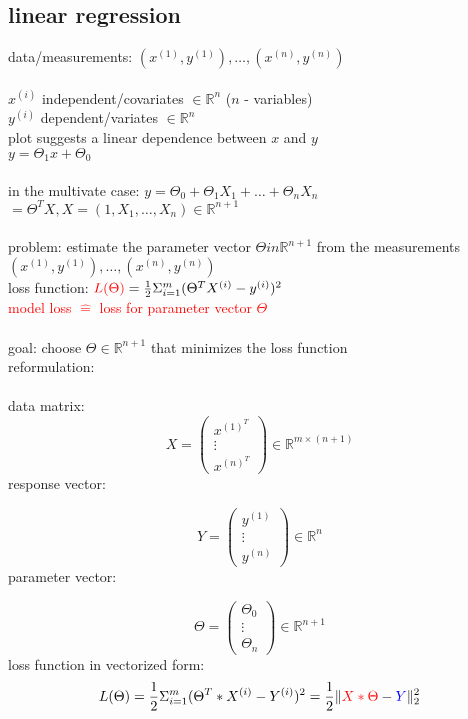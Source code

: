 \subsection*{linear regression}
data/measurements: $(x^{(1)}, y^{(1)}), \dots , (x^{(n)}, y^{(n)})$ \\\\
$x^{(i)}$ independent/covariates $\in \mathbb{R}^n$ ($n$ - variables)\\
$y^{(i)}$ dependent/variates $\in \mathbb{R}^n$\\
plot suggests a linear dependence between $x$ and $y$ \\
$y = \Theta_1 x + \Theta_0$\\\\
in the multivate case: $y = \Theta_0 + \Theta_1 X_1 + \dots + \Theta_n X_n$\\
$= \Theta^T X, X = (1, X_1, \dots ,X_n ) \in \mathbb{R}^{n+1}$\\\\

problem: estimate the parameter vector $\Theta in \mathbb{R}^{n+1}$ from the measurements $(x^{(1)}, y^{(1)}), \dots , (x^{(n)}, y^{(n)})$\\
loss function: $\textcolor{red}{L(\Theta)} = \frac{1}{2} \Sigma^m_{i=1} (\Theta^T X^{(i)} - y^{(i)})^2$\\
\textcolor{red}{model loss $\hat{=}$ loss for parameter vector $\Theta$}\\\\
goal: choose $\Theta \in \mathbb{R}^{n+1}$ that minimizes the loss function\\
reformulation:\\\\
data matrix:
\[ X =\left( \begin{array}{ccc}
x^{(1)^T} \\
\vdots \\
x^{(n)^T} \end{array} \right) \in \mathbb{R}^{m \times (n+1)}\]
response vector:

\[ Y =\left( \begin{array}{ccc}
y^{(1)} \\
\vdots \\
y^{(n)} \end{array} \right) \in \mathbb{R}^n\]
parameter vector:

\[ \Theta =\left( \begin{array}{ccc}
\Theta_0 \\
\vdots \\
\Theta_n \end{array} \right) \in \mathbb{R}^{n+1}\]
loss function in vectorized form:
\[L(\Theta) = \frac{1}{2} \Sigma^m_{i=1} (\Theta^T * X^{(i)} - Y^{(i)})^2 = \frac{1}{2} \lVert \textcolor{red}{X * \Theta} - \textcolor{blue}{Y} \lVert^2_2\]


